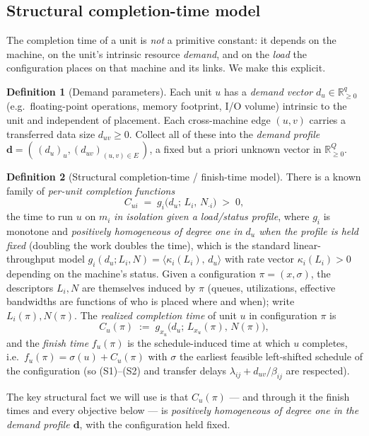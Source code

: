 \documentclass{amsart}
\theoremstyle{definition}
\newtheorem{definition}{Definition}
\begin{document}
\subsection{Structural completion-time model}

The completion time of a unit is \emph{not} a primitive constant: it depends on
the machine, on the unit's intrinsic resource \emph{demand}, and on the
\emph{load} the configuration places on that machine and its links. We make
this explicit.

\begin{definition}[Demand parameters]\label{def:demand}
Each unit $u$ has a \emph{demand vector} $d_u\in\mathbb{R}^{q}_{\ge0}$
(e.g.\ floating-point operations, memory footprint, I/O volume) intrinsic to the
unit and independent of placement. Each cross-machine edge $(u,v)$ carries a
transferred data size $d_{uv}\ge0$. Collect all of these into the
\emph{demand profile} $\mathbf d=(\,(d_u)_{u},(d_{uv})_{(u,v)\in E}\,)$, a fixed
but a priori unknown vector in $\mathbb{R}^Q_{\ge0}$.
\end{definition}

\begin{definition}[Structural completion-time / finish-time model]\label{def:struct}
There is a known family of \emph{per-unit completion functions}
\[
C_{ui}\;=\;g_i\big(d_u;\,L_i,\,N_{\cdot i}\big)\;>\;0,
\]
the time to run $u$ on $m_i$ \emph{in isolation given a load/status profile},
where $g_i$ is monotone and \emph{positively homogeneous of degree one in
$d_u$ when the profile is held fixed} (doubling the work doubles the time),
which is the standard linear-throughput model
$g_i(d_u;L_i,N)=\langle \kappa_i(L_i),\,d_u\rangle$ with rate vector
$\kappa_i(L_i)>0$ depending on the machine's status. Given a configuration
$\pi=(x,\sigma)$, the descriptors $L_i,N$ are themselves induced by $\pi$
(queues, utilizations, effective bandwidths are functions of who is placed
where and when); write $L_i(\pi),N(\pi)$. The \emph{realized completion time}
of unit $u$ in configuration $\pi$ is
\[
C_u(\pi)\;:=\;g_{x_u}\big(d_u;\,L_{x_u}(\pi),\,N(\pi)\big),
\]
and the \emph{finish time} $f_u(\pi)$ is the schedule-induced time at which $u$
completes, i.e.\ $f_u(\pi)=\sigma(u)+C_u(\pi)$ with $\sigma$ the earliest
feasible left-shifted schedule of the configuration (so (S1)--(S2) and transfer
delays $\lambda_{ij}+d_{uv}/\beta_{ij}$ are respected).
\end{definition}

The key structural fact we will use is that $C_u(\pi)$ — and through it the
finish times and every objective below — is \emph{positively homogeneous of
degree one in the demand profile $\mathbf d$}, with the configuration held
fixed.
\end{document}
